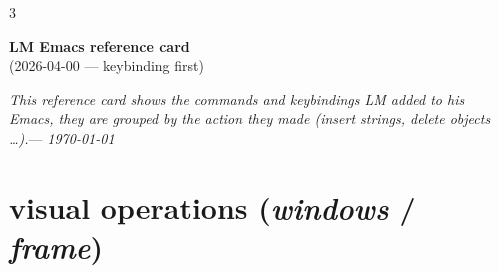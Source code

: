 \documentclass[11pt,landscape,a4paper]{article}
\begin{document}
\raggedright
\footnotesize
\begin{multicols}{3}

\setlength{\premulticols}{1pt}
\setlength{\postmulticols}{1pt}
\setlength{\multicolsep}{1pt}
\setlength{\columnsep}{2pt}


\begin{center}
     \Large{\textbf{LM Emacs reference card}} \\
     (2026-04-00 --- keybinding first)
\end{center}


%


{\itshape This reference card shows the commands and keybindings LM added to his Emacs, they are grouped by the action they made (insert strings, delete objects \dots).}\hfill --- {\itshape\scriptsize \today}

\vspace{1ex}
\hline
\vspace{1.5ex}

\section{visual operations (\textit{windows} / \textit{frame})}


\end{multicols}
\end{document}
